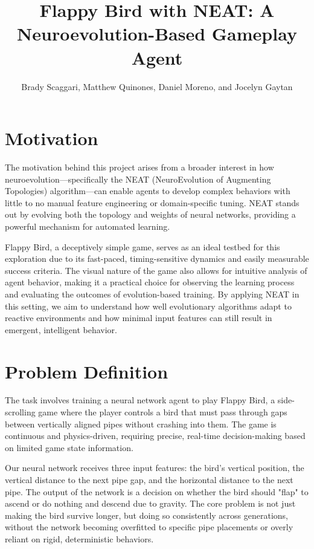 \documentclass[sigconf]{acmart}
\title{Flappy Bird with NEAT: A Neuroevolution-Based Gameplay Agent}
\author{Brady Scaggari, Matthew Quinones, Daniel Moreno, and Jocelyn Gaytan}
\begin{document}
\maketitle

\section{Motivation}
The motivation behind this project arises from a broader interest in how neuroevolution—specifically the NEAT (NeuroEvolution of Augmenting Topologies) algorithm—can enable agents to develop complex behaviors with little to no manual feature engineering or domain-specific tuning. NEAT stands out by evolving both the topology and weights of neural networks, providing a powerful mechanism for automated learning.

Flappy Bird, a deceptively simple game, serves as an ideal testbed for this exploration due to its fast-paced, timing-sensitive dynamics and easily measurable success criteria. The visual nature of the game also allows for intuitive analysis of agent behavior, making it a practical choice for observing the learning process and evaluating the outcomes of evolution-based training. By applying NEAT in this setting, we aim to understand how well evolutionary algorithms adapt to reactive environments and how minimal input features can still result in emergent, intelligent behavior.

\section{Problem Definition}
The task involves training a neural network agent to play Flappy Bird, a side-scrolling game where the player controls a bird that must pass through gaps between vertically aligned pipes without crashing into them. The game is continuous and physics-driven, requiring precise, real-time decision-making based on limited game state information.

Our neural network receives three input features: the bird's vertical position, the vertical distance to the next pipe gap, and the horizontal distance to the next pipe. The output of the network is a decision on whether the bird should "flap" to ascend or do nothing and descend due to gravity. The core problem is not just making the bird survive longer, but doing so consistently across generations, without the network becoming overfitted to specific pipe placements or overly reliant on rigid, deterministic behaviors.
\end{document}
